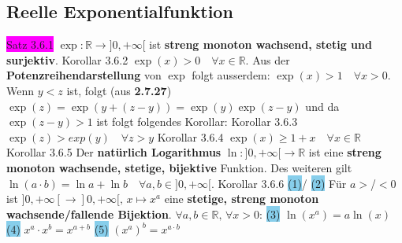 \documentclass[landscape, 10pt]{article}
\newcommand{\R}{\mathbb{R}}
\begin{document}
\begin{multicols}{3}
\subsection{Reelle Exponentialfunktion}
\colorbox{magenta}{Satz 3.6.1} \textcolor{NavyBlue}{
                $\exp:\R\longrightarrow]0,+\infty[$}
                ist \textbf{streng monoton wachsend, stetig und surjektiv}.
\colorbox{BurntOrange}{Korollar 3.6.2} 
                \textcolor{NavyBlue}{$\exp(x)>0\quad\forall x\in\R$}. 
                Aus der \textbf{Potenzreihendarstellung} von 
                \textcolor{NavyBlue}{$\exp$} folgt ausserdem: 
         \textcolor{NavyBlue}{$\exp(x)>1\quad\forall x>0$}. 
                Wenn \textcolor{NavyBlue}{$y<z$} ist, folgt (aus \textbf{2.7.27}) 
                \textcolor{NavyBlue}{$\exp(z)=\exp(y+(z-y))=\exp(y)\exp(z-y)$}  
         und da \textcolor{NavyBlue}{$\exp(z-y)>1$} ist folgt folgendes Korollar:
\colorbox{BurntOrange}{Korollar 3.6.3} 
                \textcolor{NavyBlue}{$\exp(z)>exp(y)\quad\forall z>y$}\qquad\qquad
\colorbox{BurntOrange}{Korollar 3.6.4} 
                \textcolor{NavyBlue}{$\exp(x)\geqslant1+x\quad\forall x\in\R$}
\colorbox{BurntOrange}{Korollar 3.6.5} Der \textbf{natürlich Logarithmus} 
                $\ln:]0,+\infty[\longrightarrow\R$ ist eine \textbf{streng monoton 
                wachsende, stetige, 
         bijektive} Funktion. Des weiteren gilt 
                \textcolor{NavyBlue}{$\ln(a\cdot b)=\ln a+\ln b\quad\forall a,b\in]0,+\infty[$}.
\colorbox{BurntOrange}{Korollar 3.6.6} \colorbox{SkyBlue}{(1)}/
                \colorbox{SkyBlue}{(2)} Für \textcolor{NavyBlue}{$a>$/$<0$} 
                ist \textcolor{NavyBlue}{
                $]0,+\infty[\longrightarrow]0,+\infty[,\,x\longmapsto x^a$}
                eine \textbf{stetige, streng monoton 
                wachsende/fallende Bijektion}. 
                \textcolor{NavyBlue}{$\forall a,b\in\R,\,\forall x>0$}: 
                \colorbox{SkyBlue}{(3)} \textcolor{NavyBlue}{$\ln(x^a)=a\ln(x)$}
                \colorbox{SkyBlue}{(4)} \textcolor{NavyBlue}{$x^a\cdot x^b=x^{a+b}$}
                \colorbox{SkyBlue}{(5)} \textcolor{NavyBlue}{$(x^a)^b=x^{a\cdot b}$}

\end{multicols}
\end{document}
